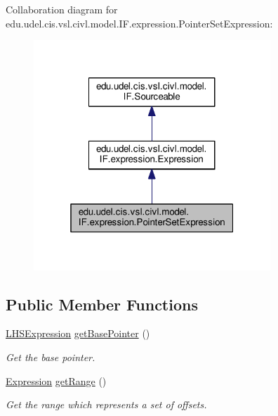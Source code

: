Collaboration diagram for edu.\+udel.\+cis.\+vsl.\+civl.\+model.\+I\+F.\+expression.\+Pointer\+Set\+Expression\+:
\nopagebreak
\begin{figure}[H]
\begin{center}
\leavevmode
\includegraphics[width=253pt]{interfaceedu_1_1udel_1_1cis_1_1vsl_1_1civl_1_1model_1_1IF_1_1expression_1_1PointerSetExpression__coll__graph}
\end{center}
\end{figure}
\subsection*{Public Member Functions}
\begin{DoxyCompactItemize}
\item 
\hyperlink{interfaceedu_1_1udel_1_1cis_1_1vsl_1_1civl_1_1model_1_1IF_1_1expression_1_1LHSExpression}{L\+H\+S\+Expression} \hyperlink{interfaceedu_1_1udel_1_1cis_1_1vsl_1_1civl_1_1model_1_1IF_1_1expression_1_1PointerSetExpression_ac14f36e425d2635c2df0204f6914c44f}{get\+Base\+Pointer} ()
\begin{DoxyCompactList}\small\item\em Get the base pointer. \end{DoxyCompactList}\item 
\hyperlink{interfaceedu_1_1udel_1_1cis_1_1vsl_1_1civl_1_1model_1_1IF_1_1expression_1_1Expression}{Expression} \hyperlink{interfaceedu_1_1udel_1_1cis_1_1vsl_1_1civl_1_1model_1_1IF_1_1expression_1_1PointerSetExpression_ae73cccca3252aefafcd8a12d0d0cd5ed}{get\+Range} ()
\begin{DoxyCompactList}\small\item\em Get the range which represents a set of offsets. \end{DoxyCompactList}\end{DoxyCompactItemize}


